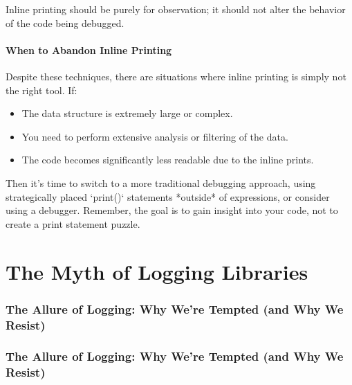 \documentclass{article}
\begin{document}
{{{{Inline printing should be purely for observation; it should not alter the behavior of the code being debugged.

\subsection*{When to Abandon Inline Printing}

Despite these techniques, there are situations where inline printing is simply not the right tool. If:

\begin{itemize}
    \item  The data structure is extremely large or complex.
    \item  You need to perform extensive analysis or filtering of the data.
    \item  The code becomes significantly less readable due to the inline prints.
\end{itemize}

Then it's time to switch to a more traditional debugging approach, using strategically placed `print()` statements *outside* of expressions, or consider using a debugger. Remember, the goal is to gain insight into your code, not to create a print statement puzzle.


\part*{The Myth of Logging Libraries} %
\label{part-7-The_Myth_of_Logging_Libraries}


\section*{The Allure of Logging: Why We're Tempted (and Why We Resist)} %
\label{chapter-7-1-The_Allure_of_Logging__Why_We_re_Tempted}

\section*{The Allure of Logging: Why We're Tempted (and Why We Resist)}

}}}}
\end{document}
